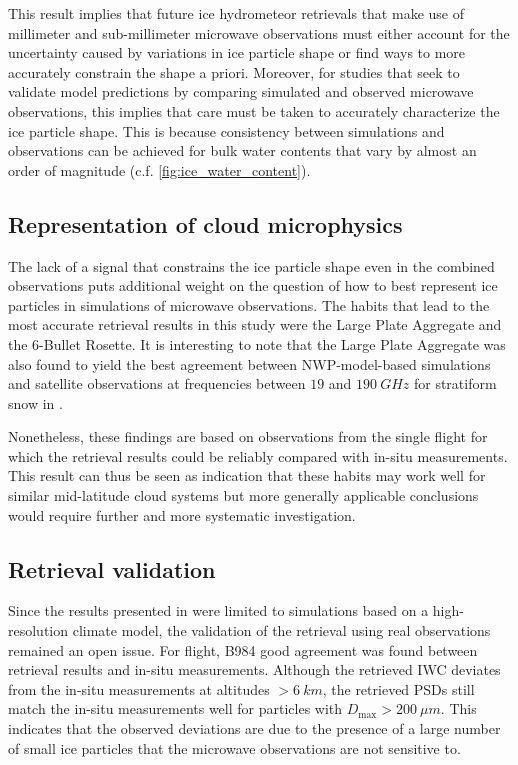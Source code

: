 \documentclass[journal abbreviation, manuscript]{copernicus}
\begin{document}
This result implies that future ice hydrometeor retrievals that make use of
millimeter and sub-millimeter microwave observations must either account for the
uncertainty caused by variations in ice particle shape or find ways to more
accurately constrain the shape a priori. Moreover, for studies that seek to
validate model predictions by comparing simulated and observed microwave
observations, this implies that care must be taken to accurately characterize
the ice particle shape. This is because consistency between simulations and
observations can be achieved for bulk water contents that vary by almost an order of
magnitude (c.f. \ref{fig:ice_water_content}).

\subsection{Representation of cloud microphysics}

The lack of a signal that constrains the ice particle shape even in the combined
observations puts additional weight on the question of how to best represent ice
particles in simulations of microwave observations. The habits that lead to the
most accurate retrieval results in this study were the Large Plate Aggregate and
the 6-Bullet Rosette. It is interesting to note that the Large Plate Aggregate
was also found to yield the best agreement between NWP-model-based simulations
and satellite observations at frequencies between $19$ and $190\ \unit{GHz}$ for
stratiform snow in \citet{geer21}.

Nonetheless, these findings are based on observations from the single flight for
which the retrieval results could be reliably compared with in-situ
measurements. This result can thus be seen as indication that these habits may
work well for similar mid-latitude cloud systems but more generally applicable
conclusions would require further and more systematic investigation.

\subsection{Retrieval validation}

Since the results presented in \citet{pfreundschuh20} were limited to
simulations based on a high-resolution climate model, the validation of the
retrieval using real observations remained an open issue. For flight, B984 good
agreement was found between retrieval results and in-situ measurements. Although
the retrieved IWC deviates from the in-situ measurements at altitudes $>
6\ \unit{km}$, the retrieved PSDs still match the in-situ measurements well for
particles with $D_\text{max} > 200\ \unit{\mu m}$. This indicates that the
observed deviations are due to the presence of a large number of small ice
particles that the microwave observations are not sensitive to.
\end{document}
